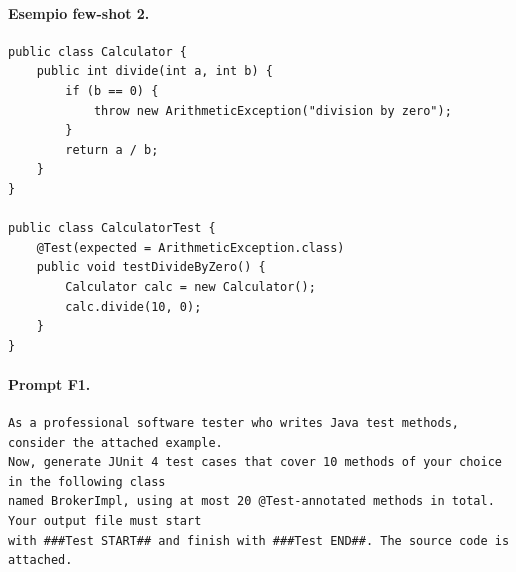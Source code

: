\paragraph*{Esempio few-shot 2.}
\label{prompt:fewshot2}
\begin{lstlisting}
public class Calculator {
    public int divide(int a, int b) {
        if (b == 0) {
            throw new ArithmeticException("division by zero");
        }
        return a / b;
    }
}

public class CalculatorTest {
    @Test(expected = ArithmeticException.class)
    public void testDivideByZero() {
        Calculator calc = new Calculator();
        calc.divide(10, 0);
    }
}
\end{lstlisting}

\paragraph*{Prompt F1.}
\label{prompt:f1}
\begin{lstlisting}
As a professional software tester who writes Java test methods, consider the attached example.
Now, generate JUnit 4 test cases that cover 10 methods of your choice in the following class
named BrokerImpl, using at most 20 @Test-annotated methods in total. Your output file must start
with ###Test START## and finish with ###Test END##. The source code is attached.
\end{lstlisting}

